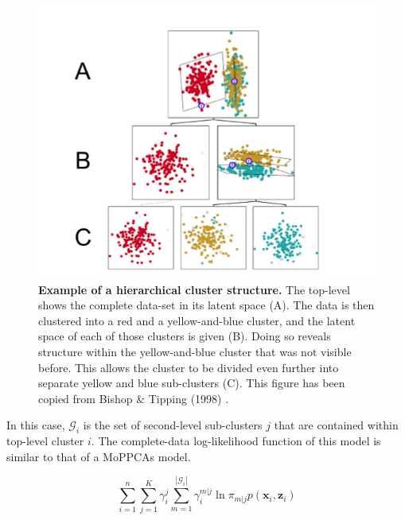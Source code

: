 \begin{figure}
    \centering
    \includegraphics{figs/hierarchy_bishoptipping.png}
    \caption[Example of a hierarchical cluster structure.]{\small \textbf{Example of a hierarchical cluster structure.} \small The top-level shows the complete data-set in its latent space (A). The data is then clustered into a red and a yellow-and-blue cluster, and the latent space of each of those clusters is given (B). Doing so reveals structure within the yellow-and-blue cluster that was not visible before. This allows the cluster to be divided even further into separate yellow and blue sub-clusters (C). This figure has been copied from Bishop \& Tipping (1998) \cite{bishop1998hierarchical}.}
    \label{fig:example_hierarchy}
\end{figure}

In this case, $\mathcal{G}_i$ is the set of second-level sub-clusters $j$ that are contained within top-level cluster $i$. The complete-data log-likelihood function of this model is similar to that of a MoPPCAs model. %

\begin{equation}\label{eq:llh_hmppca}
    \sum^n_{i=1} \sum^K_{j=1} \gamma^j_i \sum_{m=1}^{|\mathcal{G}_i|} \gamma_i^{m|j} \ln{\pi_{m|j} p(\bm{x}_i, \bm{z}_i)}%
\end{equation}

